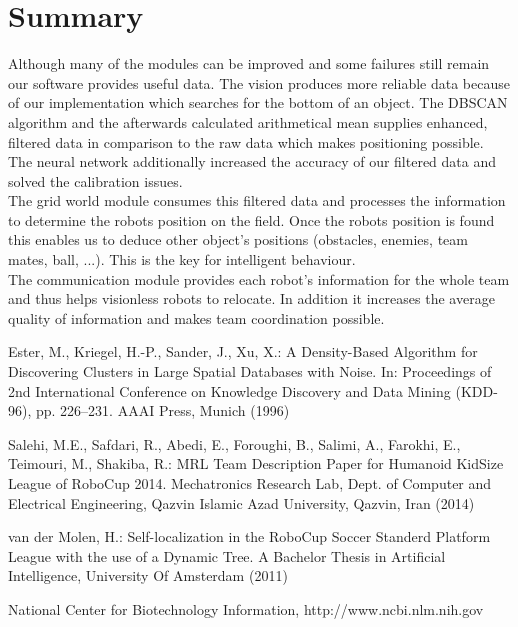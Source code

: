 \documentclass[lnicst,a4paper]{svmultln}
\begin{document}

\section{Summary}
Although many of the modules can be improved and some failures still remain our software provides useful data. The vision produces more reliable data because of our implementation which searches for the bottom of an object. The DBSCAN algorithm and the afterwards calculated arithmetical mean supplies enhanced, filtered data in comparison to the raw data which makes positioning possible. The neural network additionally increased the accuracy of our filtered data and solved the calibration issues.
\\
The grid world module consumes this filtered data and processes the information to determine the robots position on the field. Once the robots position is found this enables us to deduce other object's positions (obstacles, enemies, team mates, ball, ...). This is the key for intelligent behaviour.
\\
The communication module provides each robot's information for the whole team and thus helps visionless robots to relocate. In addition it increases the average quality of information and makes team coordination possible.





\begin{thebibliography}{5}

 Ester, M., Kriegel, H.-P., Sander, J., Xu, X.:
A Density-Based Algorithm for Discovering Clusters in Large Spatial Databases with Noise.
In: Proceedings of 2nd International Conference on Knowledge Discovery and Data Mining (KDD-96),
pp. 226--231. AAAI Press, Munich (1996)

 Salehi, M.E., Safdari, R., Abedi, E., Foroughi, B., Salimi, A., Farokhi, E., Teimouri, M., Shakiba, R.: MRL Team Description Paper for Humanoid KidSize League of RoboCup 2014. 
Mechatronics Research Lab, Dept. of Computer and Electrical Engineering,
Qazvin Islamic Azad University, Qazvin, Iran (2014)

 van der Molen, H.: Self-localization in the RoboCup Soccer Standerd Platform League with the use of a Dynamic Tree. A Bachelor Thesis in Artificial Intelligence, University Of Amsterdam (2011)

 National Center for Biotechnology Information, http://www.ncbi.nlm.nih.gov


\end{thebibliography}
\end{document}
